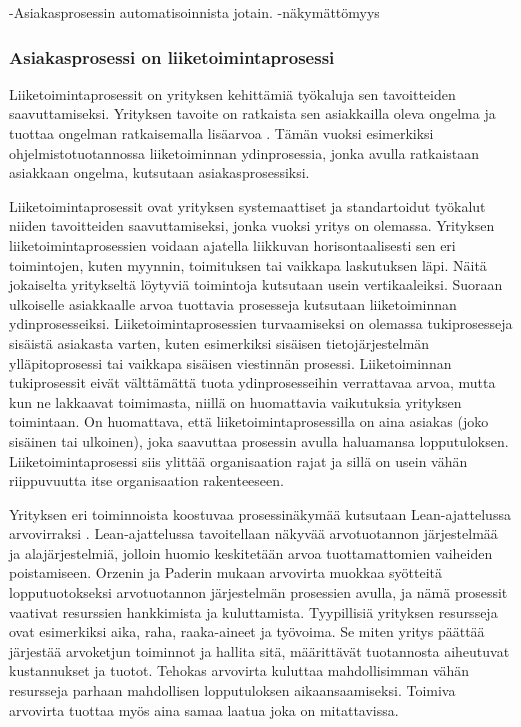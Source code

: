 \documentclass[finnish,12pt,a4paper,pdftex]{article}
\begin{document}
-Asiakasprosessin automatisoinnista jotain.
-näkymättömyys

\subsubsection{Asiakasprosessi on liiketoimintaprosessi}

Liiketoimintaprosessit on yrityksen kehittämiä työkaluja sen tavoitteiden saavuttamiseksi. Yrityksen tavoite on ratkaista sen asiakkailla oleva ongelma ja tuottaa ongelman ratkaisemalla lisäarvoa \citep{teollisuustalous}. Tämän vuoksi esimerkiksi ohjelmistotuotannossa liiketoiminnan ydinprosessia, jonka avulla ratkaistaan asiakkaan ongelma, kutsutaan asiakasprosessiksi.

Liiketoimintaprosessit ovat yrityksen systemaattiset ja standartoidut työkalut niiden tavoitteiden saavuttamiseksi, jonka vuoksi yritys on olemassa. Yrityksen liiketoimintaprosessien voidaan ajatella liikkuvan horisontaalisesti sen eri toimintojen, kuten myynnin, toimituksen tai vaikkapa laskutuksen läpi. Näitä jokaiselta yritykseltä löytyviä toimintoja kutsutaan usein vertikaaleiksi. Suoraan ulkoiselle asiakkaalle arvoa tuottavia prosesseja kutsutaan liiketoiminnan ydinprosesseiksi. Liiketoimintaprosessien turvaamiseksi on olemassa tukiprosesseja sisäistä asiakasta varten, kuten esimerkiksi sisäisen tietojärjestelmän ylläpitoprosessi tai vaikkapa sisäisen viestinnän prosessi. Liiketoiminnan tukiprosessit eivät välttämättä tuota ydinprosesseihin verrattavaa arvoa, mutta kun ne lakkaavat toimimasta, niillä on huomattavia vaikutuksia yrityksen toimintaan. On huomattava, että liiketoimintaprosessilla on aina asiakas (joko sisäinen tai ulkoinen), joka saavuttaa prosessin avulla haluamansa lopputuloksen. Liiketoimintaprosessi siis ylittää organisaation rajat ja sillä on usein vähän riippuvuutta itse organisaation rakenteeseen.

Yrityksen eri toiminnoista koostuvaa prosessinäkymää kutsutaan Lean-ajattelussa arvovirraksi \citep{leanit}. Lean-ajattelussa tavoitellaan näkyvää arvotuotannon järjestelmää ja alajärjestelmiä, jolloin huomio keskitetään arvoa tuottamattomien vaiheiden poistamiseen. Orzenin ja Paderin mukaan arvovirta muokkaa syötteitä lopputuotokseksi arvotuotannon järjestelmän prosessien avulla, ja nämä prosessit vaativat resurssien hankkimista ja kuluttamista. Tyypillisiä yrityksen resursseja ovat esimerkiksi aika, raha, raaka-aineet ja työvoima. Se miten yritys päättää järjestää arvoketjun toiminnot ja hallita sitä, määrittävät tuotannosta aiheutuvat kustannukset ja tuotot. Tehokas arvovirta kuluttaa mahdollisimman vähän resursseja parhaan mahdollisen lopputuloksen aikaansaamiseksi. Toimiva arvovirta tuottaa myös aina samaa laatua joka on mitattavissa.
\end{document}
